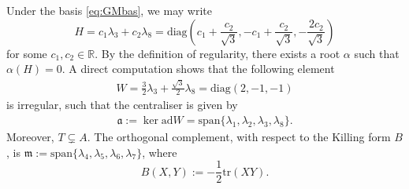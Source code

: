 \documentclass[11pt]{amsart}
\theoremstyle{definition}
\theoremstyle{plain}
\theoremstyle{conclusion}
\begin{document}
Under the basis \eqref{eq:GMbas}, we may write $$H = c_1 \lambda_3 + c_2 \lambda_8 =\mathrm{diag} \left(c_1 + \frac{c_2}{\sqrt{3}}, -c_1 + \frac{c_2}{\sqrt{3}}, -\frac{2c_2}{\sqrt{3}}\right)$$ for some $c_1,c_2 \in \mathbb{R}$. By the definition of regularity, there exists a root $\alpha$ such that $\alpha(H) = 0$. A direct computation shows that the following element  \begin{align}
    W =\frac{3}{2} \lambda_3+\frac{\sqrt3}{2} \lambda_8 =\mathrm{diag}(2,-1,-1)\label{eq:irrw}
\end{align} is irregular, such that the centraliser is given by  \begin{align*}
    \mathfrak{a}:=\ker\mathrm{ad}W     =\mathrm{span} \{\lambda_1,\lambda_2,\lambda_3,\lambda_8\}.%
\end{align*} %
Moreover, $T \subsetneq A$. The orthogonal complement, with respect to the Killing form $B$, is  $ \mathfrak{m}:= \mathrm{span}\{\lambda_4,\lambda_5,\lambda_6,\lambda_7\}  $, where $$  B(X,Y) := - \frac{1}{2}\mathrm{tr}(XY).$$   %
\end{document}
